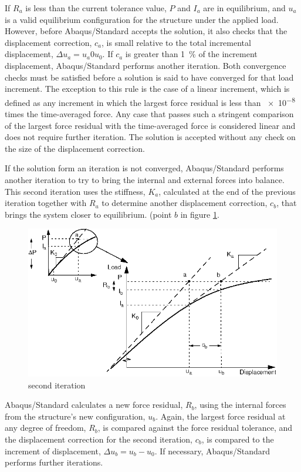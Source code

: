 If $ R_a $ is less than the current tolerance value, $ P $ and $ I_a $ are in equilibrium, and $ u_a $ is a valid equilibrium configuration for the structure under the applied load. However, before Abaqus/Standard accepts the solution, it also checks that the displacement correction, $ c_a $, is small relative to the total incremental displacement, $ \Delta u_a = u_a 0 u_0 $. If $ c_a $ is greater than \SI{1}{\percent} of the increment displacement, Abaqus/Standard performs another iteration. Both convergence checks must be satisfied before a solution is said to have converged for that load increment. The exception to this rule is the case of a linear increment, which is defined as any increment in which the largest force residual is less than \num{e-8} times the time-averaged force. Any case that passes such a stringent comparison of the largest force residual with the time-averaged force is considered linear and does not require further iteration. The solution is accepted without any check on the size of the displacement correction.

If the solution form an iteration is not converged, Abaqus/Standard performs another iteration to try to bring the internal and external forces into balance. This second iteration uses the stiffness, $ K_a $, calculated at the end of the previous iteration together with $ R_a $ to determine another displacement correction, $ c_b $, that brings the system closer to equilibrium. (point $ b $ in figure \ref{fig:second_iteration}.

\begin{figure}[h]
\centering
\includegraphics[width=0.7\linewidth]{figure/second_iteration}
\caption{second iteration}
\label{fig:second_iteration}
\end{figure}

Abaqus/Standard calculates a new force residual, $ R_b $, using the internal forces from the structure's new configuration, $ u_b $. Again, the largest force residual at any degree of freedom, $ R_b $, is compared against the force residual tolerance, and the displacement correction for the second iteration, $ c_b $, is compared to the increment of displacement, $ \Delta u_b = u_b-u_0 $. If necessary, Abaqus/Standard performs further iterations.

